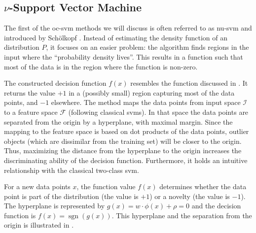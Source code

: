 



\subsection{\texorpdfstring{$\nu$-Support Vector Machine}{nu-Support Vector Machine}}\label{subsec:nu-svm}
The first of the \gls{oc-svm} methods we will discuss is often referred to as \gls{nu-svm} and introduced by Sch\"olkopf \etal \cite{scholkopf1999support}.
Instead of estimating the density function of an distribution $P$, it focuses on an easier problem: the algorithm finds regions in the input where the ``probability density lives''.
This results in a function such that most of the data is in the region where the function is non-zero.

The constructed decision function $f(x)$ resembles the function discussed in .
It returns the value $+1$ in a (possibly small) region capturing most of the data points, and $-1$ elsewhere.
The method maps the data points from input space $\mathcal{I}$ to a feature space $\mathcal{F}$ (following classical \glspl{svm}).
In that space the data points are separated from the origin by a hyperplane, with maximal margin.
Since the mapping to the feature space is based on dot products of the data points, outlier objects (which are dissimilar from the training set) will be closer to the origin.
Thus, maximizing the distance from the hyperplane to the origin increases the discriminating ability of the decision function.
Furthermore, it holds an intuitive relationship with the classical two-class \gls{svm}.

For a new data points $x$, the function value $f(x)$ determines whether the data point is part of the distribution (\ie the value is $+1$) or a novelty (\ie the value is $-1$).
The hyperplane is represented by $g(x) = w \cdot \phi(x) + \rho = 0$ and the decision function is $f(x) = \operatorname{sgn}(g(x))$.
This hyperplane and the separation from the origin is illustrated in .

